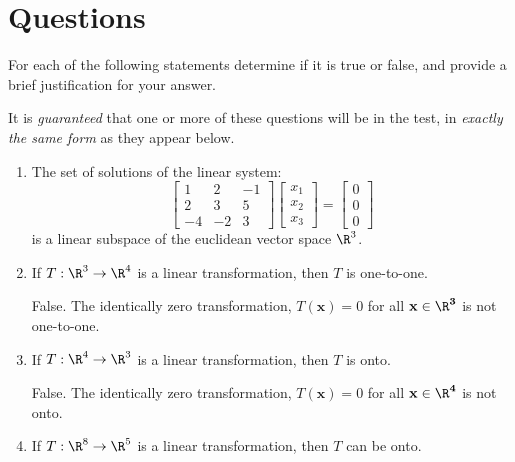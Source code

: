 \documentclass[12pt]{article}
\begin{document}
\section{Questions}
For each of the following statements determine if it is true or false, and provide a brief justification for your answer.

It is \emph{guaranteed} that one or more of these questions will be in the test, in \emph{exactly the same form} as they appear below.


\begin{enumerate}

\item The set of solutions of the linear system:
\[
\begin{bmatrix}1&2&-1\\2&3&5\\-4&-2&3\end{bmatrix}
\begin{bmatrix}x_1\\x_2\\x_3\end{bmatrix}=
\begin{bmatrix}0\\0\\0\end{bmatrix}
\]
is a linear subspace of the euclidean vector space $\R^3$.

\item If $T:\R^3\to\R^4$ is a linear transformation, then $T$ is one-to-one.

False. The identically zero transformation, $T(\mathbf{x})=0$ for all $\mathbf{x\in\R^3}$ is not one-to-one.

\item If $T:\R^4\to\R^3$ is a linear transformation, then $T$ is onto.

False. The identically zero transformation, $T(\mathbf{x})=0$ for all $\mathbf{x\in\R^4}$ is not onto.

\item If $T:\R^8\to\R^5$ is a linear transformation, then $T$ can be onto.


\end{enumerate}
\end{document}
